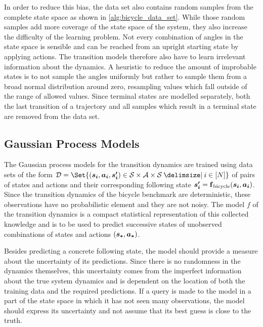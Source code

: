 In order to reduce this bias, the data set also contains random samples from the complete state space as shown in \cref{alg:bicycle_data_set}.
While those random samples add more coverage of the state space of the system, they also increase the difficulty of the learning problem.
Not every combination of angles in the state space is sensible and can be reached from an upright starting state by applying actions.
The transition models therefore also have to learn irrelevant information about the dynamics.
A heuristic to reduce the amount of improbable states is to not sample the angles uniformly but rather to sample them from a broad normal distribution around zero, resampling values which fall outside of the range of allowed values.
Since terminal states are modelled separately, both the last transition of a trajectory and all samples which result in a terminal state are removed from the data set.

\subsection{Gaussian Process Models}
\label{sub:gp_models}
The Gaussian process models for the transition dynamics are trained using data sets of the form $\D = \Set{(\mat{s_i}, \mat{a_i}, \mat{s_i^\prime}) \in \Es \times \Ah \times \Es \with i \in [N]}$ of pairs of states and actions and their corresponding following state $\bm{s_i^\prime} = \operatorname{\operatorname{\mathbf{f}}_{\text{bicycle}}}(\bm{s_i}, \bm{a_i})$.
Since the transition dynamics of the bicycle benchmark are deterministic, these observations have no probabilistic element and they are not noisy.
The model $f$ of the transition dynamics is a compact statistical representation of this collected knowledge and is to be used to predict successive states of unobserved combinations of states and actions $(\bm{s_\ast}, \bm{a_\ast})$.

Besides predicting a concrete following state, the model should provide a measure about the uncertainty of its predictions.
Since there is no randomness in the dynamics themselves, this uncertainty comes from the imperfect information about the true system dynamics and is dependent on the location of both the training data and the required predictions.
If a query is made to the model in a part of the state space in which it has not seen many observations, the model should express its uncertainty and not assume that its best guess is close to the truth.

